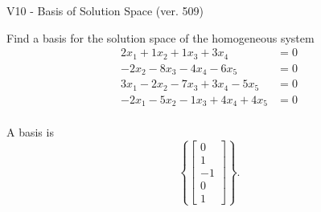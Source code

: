 \begin{exercise}
  \begin{exerciseTitle}V10 - Basis of Solution Space (ver. 509)\end{exerciseTitle}
  \begin{exerciseStatement}
    Find a basis for the solution space of the homogeneous system 
\begin{align*}
 2 x_ 1 + 1 x_ 2 + 1 x_ 3 + 3 x_ 4 &= 0  \\ 
  -2 x_ 2 -8 x_ 3 -4 x_ 4 -6 x_ 5 &= 0  \\ 
  3 x_ 1 -2 x_ 2 -7 x_ 3 + 3 x_ 4 -5 x_ 5 &= 0  \\ 
  -2 x_ 1 -5 x_ 2 -1 x_ 3 + 4 x_ 4 + 4 x_ 5 &= 0  \\ 
 \end{align*}


 
  \end{exerciseStatement}

  \begin{exerciseAnswer}
   A basis is   
\[\left\{\left[\begin{array}{c}
0 \\
1 \\
-1 \\
0 \\
1
\end{array}\right]\right\}.\]

  


  \end{exerciseAnswer}
\end{exercise}